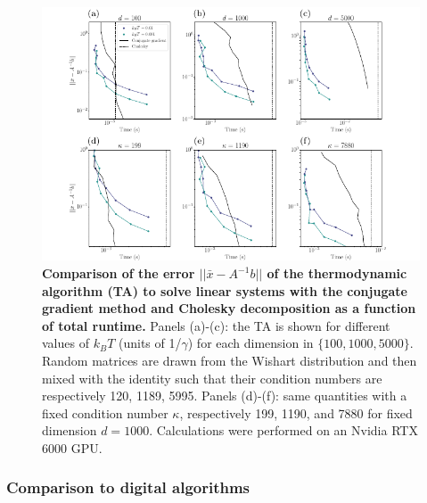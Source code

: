 \documentclass[prx,onecolumn,floatfix,longbibliography,notitlepage, nofootinbib]{revtex4-1}
\begin{document}
\begin{figure}[t]
   \centering
\includegraphics[width=\linewidth]{figures/error_vs_time_linearsys.pdf}
   \caption{\textbf{Comparison of the error $||\bar{x} - A^{-1}b||$ of the thermodynamic algorithm (TA) to solve linear systems with the conjugate gradient method and Cholesky decomposition as a function of total runtime.} Panels (a)-(c): the TA is shown for different values of $k_BT$ (units of 1/$\gamma$) for each dimension in $\{100, 1000, 5000\}$. Random matrices are drawn from the Wishart distribution and then mixed with the identity such that their condition numbers are respectively 120, 1189, 5995. Panels (d)-(f): same quantities with a fixed condition number $\kappa$, respectively 199, 1190, and 7880 for fixed dimension $d = 1000$. Calculations were performed on an Nvidia RTX 6000 GPU.}
    \label{fig:linearsys_comparison_d}
\end{figure}



\subsubsection{Comparison to digital algorithms}
\end{document}
